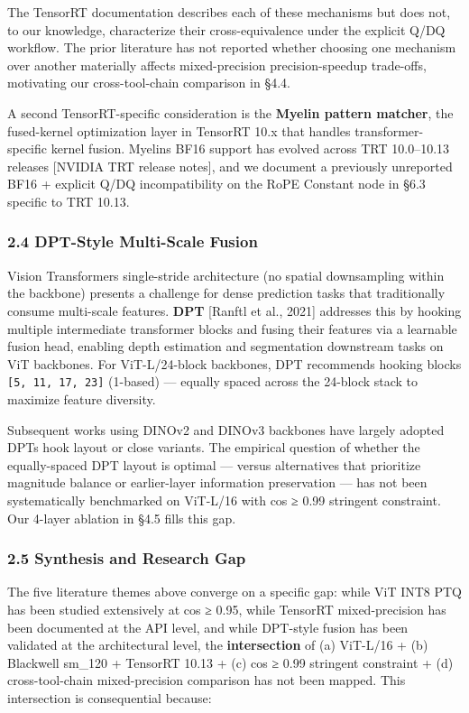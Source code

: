 \documentclass[
]{article}
\begin{document}
The TensorRT documentation describes each of these mechanisms but does
not, to our knowledge, characterize their cross-equivalence under the
explicit Q/DQ workflow. The prior literature has not reported whether
choosing one mechanism over another materially affects mixed-precision
precision-speedup trade-offs, motivating our cross-tool-chain comparison
in §4.4.

A second TensorRT-specific consideration is the \textbf{Myelin pattern
matcher}, the fused-kernel optimization layer in TensorRT 10.x that
handles transformer-specific kernel fusion. Myelin\textquotesingle s
BF16 support has evolved across TRT 10.0--10.13 releases {[}NVIDIA TRT
release notes{]}, and we document a previously unreported BF16 +
explicit Q/DQ incompatibility on the RoPE Constant node in §6.3 specific
to TRT 10.13.

\subsubsection{2.4 DPT-Style Multi-Scale
Fusion}\label{24-dpt-style-multi-scale-fusion}

Vision Transformers\textquotesingle{} single-stride architecture (no
spatial downsampling within the backbone) presents a challenge for dense
prediction tasks that traditionally consume multi-scale features.
\textbf{DPT} {[}Ranftl et al., 2021{]} addresses this by hooking
multiple intermediate transformer blocks and fusing their features via a
learnable fusion head, enabling depth estimation and segmentation
downstream tasks on ViT backbones. For ViT-L/24-block backbones, DPT
recommends hooking blocks \texttt{{[}5,\ 11,\ 17,\ 23{]}} (1-based) ---
equally spaced across the 24-block stack to maximize feature diversity.

Subsequent works using DINOv2 and DINOv3 backbones have largely adopted
DPT\textquotesingle s hook layout or close variants. The empirical
question of whether the equally-spaced DPT layout is optimal --- versus
alternatives that prioritize magnitude balance or earlier-layer
information preservation --- has not been systematically benchmarked on
ViT-L/16 with cos ≥ 0.99 stringent constraint. Our 4-layer ablation in
§4.5 fills this gap.

\subsubsection{2.5 Synthesis and Research
Gap}\label{25-synthesis-and-research-gap}

The five literature themes above converge on a specific gap: while ViT
INT8 PTQ has been studied extensively at cos ≥ 0.95, while TensorRT
mixed-precision has been documented at the API level, and while
DPT-style fusion has been validated at the architectural level, the
\textbf{intersection} of (a) ViT-L/16 + (b) Blackwell sm\_120 + TensorRT
10.13 + (c) cos ≥ 0.99 stringent constraint + (d) cross-tool-chain
mixed-precision comparison has not been mapped. This intersection is
consequential because:
\end{document}
